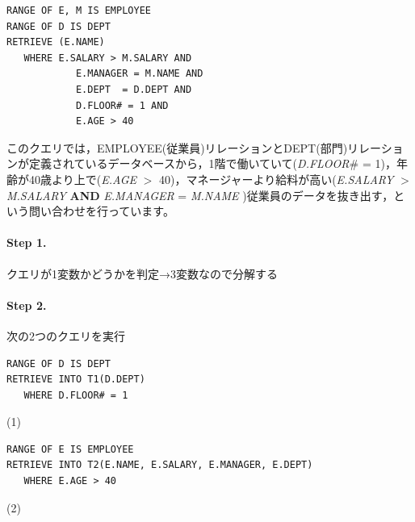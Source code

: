 \begin{center}
 \begin{minipage}{0.8\textwidth}
  \begin{lstlisting}
RANGE OF E, M IS EMPLOYEE
RANGE OF D IS DEPT
RETRIEVE (E.NAME)
   WHERE E.SALARY > M.SALARY AND
            E.MANAGER = M.NAME AND
            E.DEPT  = D.DEPT AND
            D.FLOOR# = 1 AND
            E.AGE > 40
  \end{lstlisting}
 \end{minipage}
\end{center}

このクエリでは，EMPLOYEE(従業員)リレーションとDEPT(部門)リレーションが定義されているデータベースから，1階で働いていて({\it D.FLOOR}\# = 1)，年齢が40歳より上で({\it E.AGE} $>$ 40)，マネージャーより給料が高い({\it E.SALARY} $>$ {\it M.SALARY} {\bf AND} {\it E.MANAGER} = {\it M.NAME} )従業員のデータを抜き出す，という問い合わせを行っています。

\paragraph{Step 1. }
クエリが1変数かどうかを判定→3変数なので分解する

\paragraph{Step 2. }
次の2つのクエリを実行

\begin{center}
 \begin{minipage}{0.8\textwidth}
  \begin{lstlisting}
RANGE OF D IS DEPT
RETRIEVE INTO T1(D.DEPT)
   WHERE D.FLOOR# = 1
  \end{lstlisting}
 \end{minipage}
 \begin{minipage}{0.05\textwidth}
  (1)
 \end{minipage}

 \begin{minipage}{0.8\textwidth}
  \begin{lstlisting}
RANGE OF E IS EMPLOYEE
RETRIEVE INTO T2(E.NAME, E.SALARY, E.MANAGER, E.DEPT)
   WHERE E.AGE > 40
  \end{lstlisting}
 \end{minipage}
 \begin{minipage}{0.05\textwidth}
  (2)
 \end{minipage}
\end{center}

